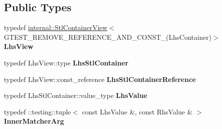 \subsection*{Public Types}
\begin{DoxyCompactItemize}
\item 
\mbox{\label{classtesting_1_1internal_1_1_pointwise_matcher_1_1_impl_a5240abc710bb0a5bedfd180bf6701fae}} 
typedef \mbox{\hyperlink{classtesting_1_1internal_1_1_stl_container_view}{internal\+::\+Stl\+Container\+View}}$<$ G\+T\+E\+S\+T\+\_\+\+R\+E\+M\+O\+V\+E\+\_\+\+R\+E\+F\+E\+R\+E\+N\+C\+E\+\_\+\+A\+N\+D\+\_\+\+C\+O\+N\+S\+T\+\_\+(Lhs\+Container)$>$ {\bfseries Lhs\+View}
\item 
\mbox{\label{classtesting_1_1internal_1_1_pointwise_matcher_1_1_impl_a23420b57b4cd6d83cec8afda746c27f2}} 
typedef Lhs\+View\+::type {\bfseries Lhs\+Stl\+Container}
\item 
\mbox{\label{classtesting_1_1internal_1_1_pointwise_matcher_1_1_impl_a9df3eb0866f76d59dbdd35fafeb5590c}} 
typedef Lhs\+View\+::const\+\_\+reference {\bfseries Lhs\+Stl\+Container\+Reference}
\item 
\mbox{\label{classtesting_1_1internal_1_1_pointwise_matcher_1_1_impl_a453769e721f4212e399f76c980b4b65c}} 
typedef Lhs\+Stl\+Container\+::value\+\_\+type {\bfseries Lhs\+Value}
\item 
\mbox{\label{classtesting_1_1internal_1_1_pointwise_matcher_1_1_impl_aba9d983881cbfbb37724b8b40e863898}} 
typedef \+::testing\+::tuple$<$ const Lhs\+Value \&, const Rhs\+Value \& $>$ {\bfseries Inner\+Matcher\+Arg}
\end{DoxyCompactItemize}
